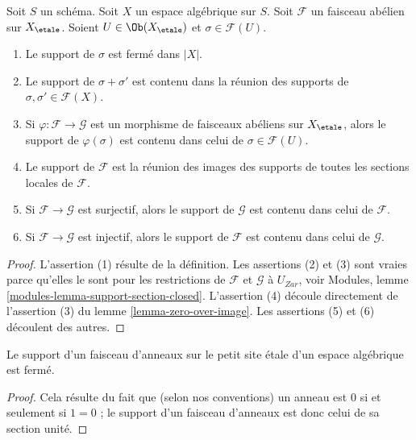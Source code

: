 \begin{lemma}
\label{lemma-support-section-closed}
Soit $S$ un schéma.
Soit $X$ un espace algébrique sur $S$.
Soit $\mathcal{F}$ un faisceau abélien sur $X_\etale$.
Soient $U \in \Ob(X_\etale)$ et $\sigma \in \mathcal{F}(U)$.
\begin{enumerate}
\item Le support de $\sigma$ est fermé dans $|X|$.
\item Le support de $\sigma + \sigma'$ est contenu dans la réunion des
supports de $\sigma, \sigma' \in \mathcal{F}(X)$.
\item Si $\varphi : \mathcal{F} \to \mathcal{G}$ est un morphisme de
faisceaux abéliens sur $X_\etale$, alors le support de $\varphi(\sigma)$ est
contenu dans celui de $\sigma \in \mathcal{F}(U)$.
\item Le support de $\mathcal{F}$ est la réunion des images des
supports de toutes les sections locales de $\mathcal{F}$.
\item Si $\mathcal{F} \to \mathcal{G}$ est surjectif, alors le support
de $\mathcal{G}$ est contenu dans celui de $\mathcal{F}$.
\item Si $\mathcal{F} \to \mathcal{G}$ est injectif, alors le support
de $\mathcal{F}$ est contenu dans celui de $\mathcal{G}$.
\end{enumerate}
\end{lemma}

\begin{proof}
L'assertion (1) résulte de la définition.
Les assertions (2) et (3) sont vraies parce qu'elles le sont pour les
restrictions de $\mathcal{F}$ et $\mathcal{G}$ à $U_{Zar}$, voir
Modules, lemme \ref{modules-lemma-support-section-closed}.
L'assertion (4) découle directement de l'assertion (3) du
lemme \ref{lemma-zero-over-image}.
Les assertions (5) et (6) découlent des autres.
\end{proof}

\begin{lemma}
\label{lemma-support-sheaf-rings-closed}
Le support d'un faisceau d'anneaux sur le petit site \'etale d'un
espace algébrique est fermé.
\end{lemma}

\begin{proof}
Cela résulte du fait que (selon nos conventions)
un anneau est $0$ si et seulement si
$1 = 0$ ; le support d'un faisceau d'anneaux
est donc celui de sa section unité.
\end{proof}






